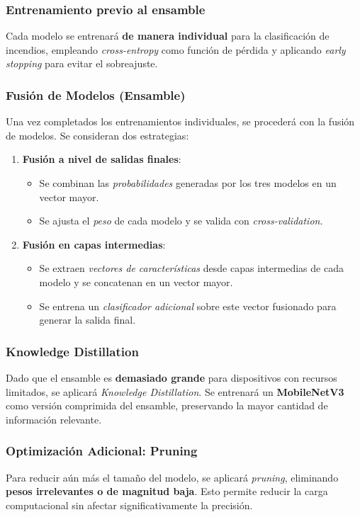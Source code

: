 \subsubsection{Entrenamiento previo al ensamble}
Cada modelo se entrenará \textbf{de manera individual} para la clasificación de incendios, empleando \textit{cross-entropy} como función de pérdida y aplicando \textit{early stopping} para evitar el sobreajuste.

\subsubsection{Fusión de Modelos (Ensamble)}
Una vez completados los entrenamientos individuales, se procederá con la fusión de modelos. Se consideran dos estrategias:

\begin{enumerate}
    \item \textbf{Fusión a nivel de salidas finales}:
    \begin{itemize}
        \item Se combinan las \textit{probabilidades} generadas por los tres modelos en un vector mayor.
        \item Se ajusta el \textit{peso} de cada modelo y se valida con \textit{cross-validation}.
    \end{itemize}

    \item \textbf{Fusión en capas intermedias}:
    \begin{itemize}
        \item Se extraen \textit{vectores de características} desde capas intermedias de cada modelo y se concatenan en un vector mayor.
        \item Se entrena un \textit{clasificador adicional} sobre este vector fusionado para generar la salida final.
    \end{itemize}
\end{enumerate}

\subsubsection{Knowledge Distillation}
Dado que el ensamble es \textbf{demasiado grande} para dispositivos con recursos limitados, se aplicará \textit{Knowledge Distillation}. Se entrenará un \textbf{MobileNetV3} como versión comprimida del ensamble, preservando la mayor cantidad de información relevante.

\subsubsection{Optimización Adicional: Pruning}
Para reducir aún más el tamaño del modelo, se aplicará \textit{pruning}, eliminando \textbf{pesos irrelevantes o de magnitud baja}. Esto permite reducir la carga computacional sin afectar significativamente la precisión.

